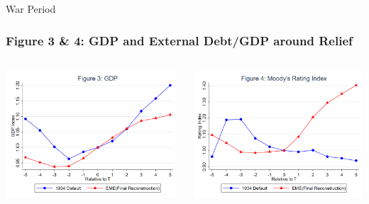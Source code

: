 \documentclass{beamer}
\begin{document}
\begin{frame}{War Period}
  \frametitle{Figure 3 \& 4: GDP and External Debt/GDP around Relief}
  \begin{columns}
    \begin{column}{0.5\textwidth}
      \centering
      \includegraphics[width=0.9\linewidth]{figures/Figure3_GDP_Comparison.png} %
      \label{fig:3_slide}
    \end{column}
    \begin{column}{0.5\textwidth}
      \centering
      \includegraphics[width=0.9\linewidth]{figures/Figure4_Rating_Comparison.png} %

\end{column}
\end{columns}
\end{frame}
\end{document}
